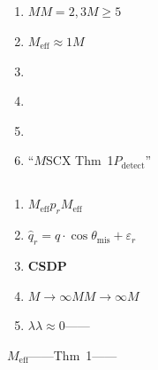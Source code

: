\documentclass[12pt,a4paper]{article}
\theoremstyle{remark}
\newcommand{\misalignAngle}{\theta_{\text{mis}}}
\begin{document}
\subsection{}



\begin{enumerate}[label=\textbf{ \arabic*}, leftmargin=*]
    \item \textbf{$M$}$M=2,3$$M \geq 5$
    
    \item \textbf{}$M_{\text{eff}} \approx 1$$M$
    
    \item \textbf{}
    
    \item \textbf{}
    
    \item \textbf{}
    
    \item \textbf{}``$M$SCX Thm~1$P_{\text{detect}}$''
\end{enumerate}

\subsection{}



\begin{enumerate}[label=(\arabic*)]
    \item \textbf{}$M_{\text{eff}}$$p_r$$M_{\text{eff}}$
    
    \item \textbf{}$\hat{q}_r = q \cdot \cos\misalignAngle + \varepsilon_r$
    
    \item \textbf{CSDP}
    
    \item \textbf{$M \to \infty$}$M$$M \to \infty$$M$
    
    \item \textbf{}$\lambda$$\lambda \approx 0$——
\end{enumerate}

\begin{honestcrit}{$M_{\text{eff}}$——Thm~1\textit{}——}
\end{honestcrit}

\subsection{}
\end{document}
